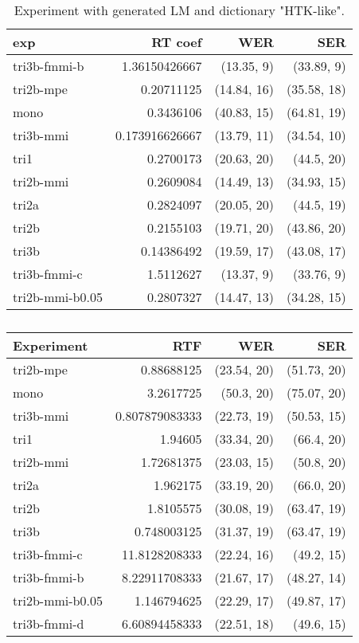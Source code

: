 \begin{table}[!htp]\label{tab:htk_like_gen_lm}\centering\begin{tabular}{l|rrr}
exp             & RT coef        & WER         & SER        \\ 
\hline
tri3b-fmmi-b    & 1.36150426667  & (13.35, 9)  & (33.89, 9) \\ 
tri2b-mpe       & 0.20711125     & (14.84, 16) & (35.58, 18)\\ 
mono            & 0.3436106      & (40.83, 15) & (64.81, 19)\\ 
tri3b-mmi       & 0.173916626667 & (13.79, 11) & (34.54, 10)\\ 
tri1            & 0.2700173      & (20.63, 20) & (44.5, 20) \\ 
tri2b-mmi       & 0.2609084      & (14.49, 13) & (34.93, 15)\\ 
tri2a           & 0.2824097      & (20.05, 20) & (44.5, 19) \\ 
tri2b           & 0.2155103      & (19.71, 20) & (43.86, 20)\\ 
tri3b           & 0.14386492     & (19.59, 17) & (43.08, 17)\\ 
tri3b-fmmi-c    & 1.5112627      & (13.37, 9)  & (33.76, 9) \\ 
tri2b-mmi-b0.05 & 0.2807327      & (14.47, 13) & (34.28, 15)\\ 
\end{tabular}
\caption{Experiment with generated LM and dictionary "\ac{HTK}-like".}
\end{table}  

\begin{table}[!htp]\label{tab:best_oov}\centering\begin{tabular}{l|rrr}
Experiment      & \ac{RTF}       & \ac{WER}         & \ac{SER} \\
\hline
tri2b-mpe       & 0.88688125     & (23.54, 20) & (51.73, 20)\\
mono            & 3.2617725      & (50.3, 20)  & (75.07, 20)\\
tri3b-mmi       & 0.807879083333 & (22.73, 19) & (50.53, 15)\\
tri1            & 1.94605        & (33.34, 20) & (66.4, 20) \\
tri2b-mmi       & 1.72681375     & (23.03, 15) & (50.8, 20) \\
tri2a           & 1.962175       & (33.19, 20) & (66.0, 20) \\
tri2b           & 1.8105575      & (30.08, 19) & (63.47, 19)\\
tri3b           & 0.748003125    & (31.37, 19) & (63.47, 19)\\
tri3b-fmmi-c    & 11.8128208333  & (22.24, 16) & (49.2, 15) \\
tri3b-fmmi-b    & 8.22911708333  & (21.67, 17) & (48.27, 14)\\
tri2b-mmi-b0.05 & 1.146794625    & (22.29, 17) & (49.87, 17)\\
tri3b-fmmi-d    & 6.60894458333  & (22.51, 18) & (49.6, 15)
\end{tabular}
\caption{}
\end{table}  


